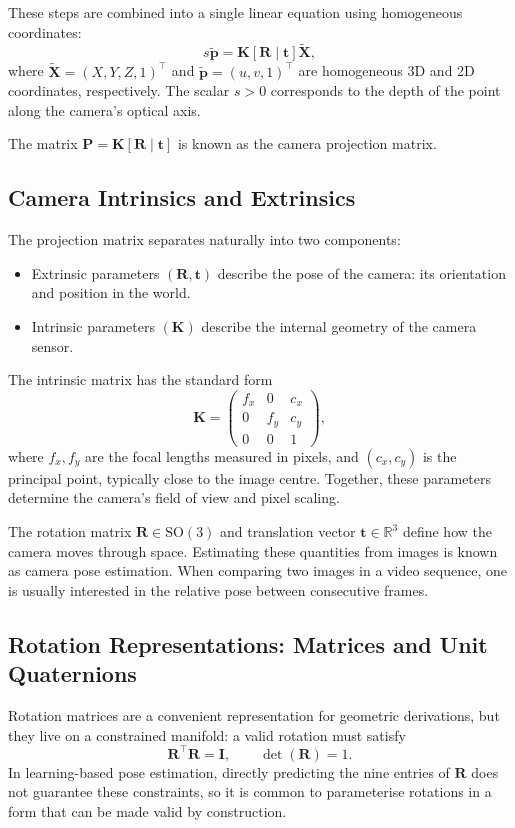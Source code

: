 These steps are combined into a single linear equation using homogeneous coordinates:
\begin{equation}
    s \tilde{\mathbf{p}} = \mathbf{K} [\mathbf{R} \mid \mathbf{t}] \tilde{\mathbf{X}},
\end{equation}
where $\tilde{\mathbf{X}} = (X,Y,Z,1)^\top$ and $\tilde{\mathbf{p}} = (u,v,1)^\top$ are homogeneous 3D and 2D coordinates, respectively. The scalar $s > 0$ corresponds to the depth of the point along the camera’s optical axis.

The matrix $\mathbf{P} = \mathbf{K} [\mathbf{R} \mid \mathbf{t}]$ is known as the camera projection matrix.

\subsection{Camera Intrinsics and Extrinsics}
The projection matrix separates naturally into two components:

\begin{itemize}
    \item Extrinsic parameters $(\mathbf{R}, \mathbf{t})$ describe the pose of the camera: its orientation and position in the world.
    \item Intrinsic parameters $(\mathbf{K})$ describe the internal geometry of the camera sensor.
\end{itemize}

The intrinsic matrix has the standard form
\begin{equation}
    \mathbf{K} =
    \begin{pmatrix}
        f_x & 0   & c_x \\
        0   & f_y & c_y \\
        0   & 0   & 1
    \end{pmatrix},
\end{equation}
where $f_x, f_y$ are the focal lengths measured in pixels, and $(c_x, c_y)$ is the principal point, typically close to the image centre. Together, these parameters determine the camera’s field of view and pixel scaling.

The rotation matrix $\mathbf{R} \in \mathrm{SO}(3)$ and translation vector $\mathbf{t} \in \mathbb{R}^3$ define how the camera moves through space. Estimating these quantities from images is known as camera pose estimation. When comparing two images in a video sequence, one is usually interested in the relative pose between consecutive frames.

\subsection{Rotation Representations: Matrices and Unit Quaternions}
Rotation matrices are a convenient representation for geometric derivations, but they live on a constrained manifold: a valid rotation must satisfy
\begin{equation}
    \mathbf{R}^\top \mathbf{R} = \mathbf{I}, \qquad \det(\mathbf{R}) = 1.
\end{equation}
In learning-based pose estimation, directly predicting the nine entries of $\mathbf{R}$ does not guarantee these constraints, so it is common to parameterise rotations in a form that can be made valid by construction.

